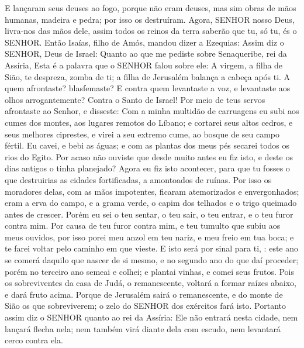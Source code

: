 {E lançaram seus deuses ao fogo, porque não eram deuses, mas sim obras de mãos humanas, madeira e pedra; por isso os destruíram.
Agora, SENHOR nosso Deus, livra-nos das mãos dele,
{} assim todos os reinos da terra saberão que tu, só tu, és o SENHOR.
Então Isaías, filho de Amós, mandou dizer a Ezequias: Assim diz o SENHOR, Deus de Israel: Quanto ao que me pediste sobre Senaqueribe, rei da Assíria,
Esta é a palavra que o SENHOR falou sobre ele: A virgem, a filha de Sião, te despreza, zomba de ti; a filha de Jerusalém balança a cabeça após ti.
A quem afrontaste?
{} blasfemaste? E contra quem levantaste a voz, e levantaste aos olhos arrogantemente? Contra o Santo de Israel!
Por meio de teus servos afrontaste ao Senhor, e disseste: Com a minha multidão de carruagens eu subi aos cumes dos montes, aos lugares remotos do Líbano; e cortarei seus altos cedros, e seus melhores ciprestes,
 e virei a seu extremo cume, ao bosque de seu campo fértil.
Eu cavei, e bebi as águas; e com as plantas dos meus pés secarei todos os rios do Egito.
Por acaso não ouviste que desde muito antes eu fiz isto, e deste os dias antigos o tinha planejado? Agora eu fiz isto acontecer, para que tu fosses o que destruirias as cidades fortificadas,
{} a amontoados de ruínas.
Por isso os moradores delas, com as mãos impotentes, ficaram atemorizados e envergonhados; eram
{} a erva do campo, e a grama verde, o capim dos telhados e o trigo queimado antes de crescer.
Porém eu sei o teu sentar, o teu sair, o teu entrar, e o teu furor contra mim.
Por causa de teu furor contra mim, e teu tumulto
 que subiu aos meus ouvidos, por isso porei meu anzol em teu nariz, e meu freio em tua boca; e te farei voltar pelo caminho em que vieste.
E isto será por sinal para ti,
{} : este ano se comerá daquilo que nascer de si mesmo, e no segundo ano do que daí proceder; porém no terceiro ano semeai e colhei; e plantai vinhas, e comei seus frutos.
Pois os sobreviventes da casa de Judá, o remanescente, voltará a formar raízes abaixo, e dará fruto acima.
Porque de Jerusalém sairá o remanescente, e do monte de Sião os que sobreviverem; o zelo do SENHOR dos exércitos fará isto.
Portanto assim diz o SENHOR quanto ao rei da Assíria: Ele não entrará nesta cidade, nem lançará flecha nela; nem também virá diante dela com escudo, nem levantará cerco contra ela.
}
